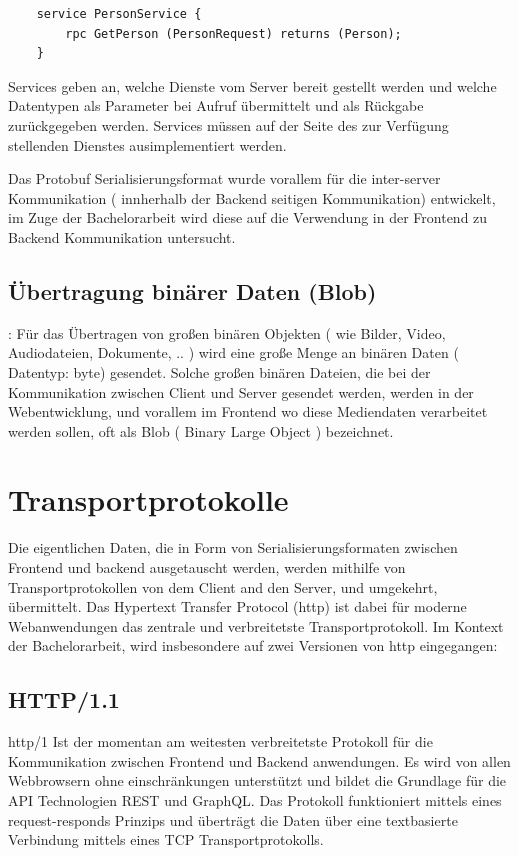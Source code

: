 \begin{verbatim}
	service PersonService {
		rpc GetPerson (PersonRequest) returns (Person);
	}
\end{verbatim}

Services geben an, welche Dienste vom Server bereit gestellt werden und welche Datentypen als Parameter bei Aufruf übermittelt und als Rückgabe zurückgegeben werden. Services müssen auf der Seite des zur Verfügung stellenden Dienstes ausimplementiert werden.

Das Protobuf Serialisierungsformat wurde vorallem für die inter-server Kommunikation ( innherhalb der Backend seitigen Kommunikation) entwickelt, im Zuge der Bachelorarbeit wird diese auf die Verwendung in der Frontend zu Backend Kommunikation untersucht.

\subsection{Übertragung binärer Daten (Blob)}:
Für das Übertragen von großen binären Objekten ( wie Bilder, Video, Audiodateien, Dokumente, .. ) wird eine große Menge an binären Daten ( Datentyp: byte) gesendet. Solche großen binären Dateien, die bei der Kommunikation zwischen Client und Server gesendet werden, werden in der Webentwicklung, und vorallem im Frontend wo diese Mediendaten verarbeitet werden sollen, oft als Blob ( Binary Large Object ) bezeichnet. 


\section{Transportprotokolle}
Die eigentlichen Daten, die in Form von Serialisierungsformaten zwischen Frontend und backend ausgetauscht werden, werden mithilfe von Transportprotokollen von dem Client and den Server, und umgekehrt, übermittelt. Das Hypertext Transfer Protocol (http) ist dabei für moderne Webanwendungen das zentrale und verbreitetste Transportprotokoll. Im Kontext der Bachelorarbeit, wird insbesondere auf zwei Versionen von http eingegangen:

\subsection{HTTP/1.1}

http/1 Ist der momentan am weitesten verbreitetste Protokoll für die Kommunikation zwischen Frontend und Backend anwendungen. Es wird von allen Webbrowsern ohne einschränkungen unterstützt und bildet die Grundlage für die API Technologien REST und GraphQL. Das Protokoll funktioniert mittels eines request-responds Prinzips und überträgt die Daten über eine textbasierte Verbindung mittels eines TCP Transportprotokolls. 

